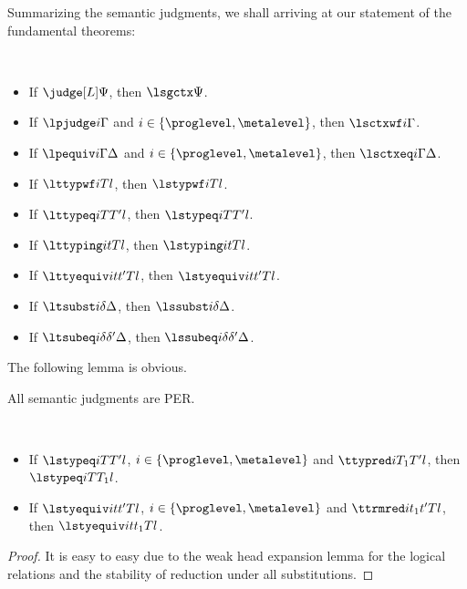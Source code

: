 Summarizing the semantic judgments, we shall arriving at our statement of the
fundamental theorems:
\begin{theorem}[Fundamental] $ $
  \begin{itemize}
  \item If $\judge[L]\Psi$, then $\lsgctx \Psi$. 
  \item If $\lpjudge i \Gamma$ and $i \in \{\proglevel, \metalevel\}$, then $\lsctxwf i \Gamma$. 
  \item If $\lpequiv i \Gamma\Delta$ and $i \in \{\proglevel, \metalevel\}$, then $\lsctxeq i \Gamma{\Delta}$. 
  \item If $\lttypwf i T l$, then $\lstypwf i T l$. 
  \item If $\lttypeq i T{T'} l$, then $\lstypeq i T{T'} l$. 
  \item If $\lttyping i t T l$, then $\lstyping i t T l$.
  \item If $\lttyequiv i t{t'} T l$, then $\lstyequiv i t{t'} T l$.
  \item If $\ltsubst i \delta \Delta$, then $\lssubst i \delta{\Delta}$. 
  \item If $\ltsubeq i\delta{\delta'}\Delta$, then $\lssubeq i \delta{\delta'}{\Delta}$.
  \end{itemize}
\end{theorem}

The following lemma is obvious. 
\begin{lemma}[PER]
  All semantic judgments are PER.
\end{lemma}

\begin{lemma} $ $
  \begin{itemize}
  \item If $\lstypeq i T{T'} l$, $i \in \{\proglevel, \metalevel\}$ and $\ttypred i {T_1}{T'} l$, then $\lstypeq i{T}{T_1} l$.
  \item If $\lstyequiv i t{t'} T l$, $i \in \{\proglevel, \metalevel\}$ and $\ttrmred i{t_1}{t'}T l$, then
    $\lstyequiv i t{t_1} T l$.
  \end{itemize}
\end{lemma}
\begin{proof}
  It is easy to easy due to the weak head expansion lemma for the logical relations
  and the stability of reduction under all substitutions. 
\end{proof}

